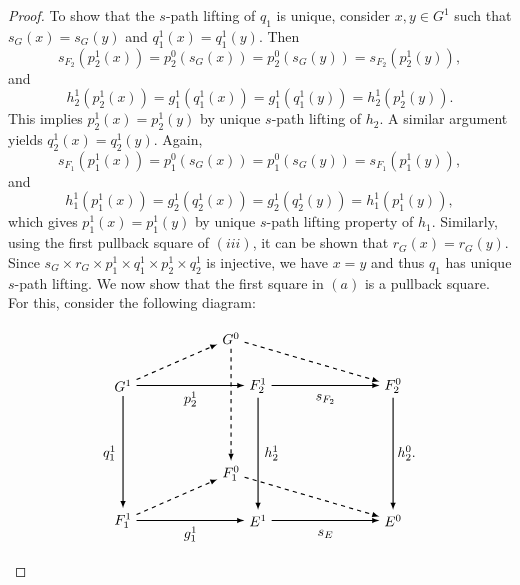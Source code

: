 \documentclass[a4paper,reqno,12pt]{amsart}
\theoremstyle{definition}
\theoremstyle{remark}
\begin{document}
\begin{proof}
To show that the $s$-path lifting of $q_1$ is unique, consider $x,y\in G^1$ such that $s_G(x)=s_G(y)$ and $q_1^1(x)=q_1^1(y)$. Then \[s_{F_2}(p_2^1(x))=p_2^0(s_G(x))=p_2^0(s_G(y))=s_{F_2}(p_2^1(y)),\] and \[h_2^1(p_2^1(x))=g_1^1(q_1^1(x))=g_1^1(q_1^1(y))=h_2^1(p_2^1(y)).\] This implies $p_2^1(x)=p_2^1(y)$ by unique $s$-path lifting of $h_2$. A similar argument yields $q_2^1(x)=q_2^1(y)$. Again, \[s_{F_1}(p_1^1(x))=p_1^0(s_G(x))=p_1^0(s_G(y))=s_{F_1}(p_1^1(y)),\] and \[h_1^1(p_1^1(x))=g_2^1(q_2^1(x))=g_2^1(q_2^1(y))=h_1^1(p_1^1(y)),\] which gives $p_1^1(x)=p_1^1(y)$ by unique $s$-path lifting property of $h_1$. Similarly, using the first pullback square of $(iii)$, it can be shown that $r_G(x)=r_G(y)$. Since $s_G\times r_G\times p_1^1\times q_1^1\times p_2^1\times q_2^1$ is injective, we have $x=y$ and thus $q_1$ has unique $s$-path lifting. We now show that the first square in $(a)$ is a pullback square. For this, consider the following diagram:

\[
\begin{tikzpicture}[scale=1.7]
\node[] (A1) at (0,0) {$G^1$};
\node[] (A2) at (2,0) {$F_2^1$};
\node[] (A3) at (0,-2) {$F_1^1$};
\node[] (A4) at (2,-2) {$E^1$};

\node[] (B1) at (1.6,0.7) {$G^0$};
\node[] (B2) at (4,0) {$F_2^0$};
\node[] (B3) at (1.6,-1.3) {$F_1^0$};
\node[] (B4) at (4,-2) {$E^0$};

\path[->, black, >=latex,thick] (A1) edge [] node[]{} (A2);
\path[->, black, >=latex,thick] (A3) edge [] node[]{} (A4);
\path[->, black, >=latex,thick] (A1) edge [] node[]{} (A3);
\path[->, black, >=latex,thick] (A2) edge [] node[]{} (A4);

\path[->,black, dashed, >=latex,thick] (B1) edge [] node[]{} (B3);
\path[->,black, >=latex,thick] (A4) edge [] node[]{} (B4);
\path[->,black, >=latex,thick] (A2) edge [] node[]{} (B2);
\path[->,black, >=latex,thick] (B2) edge [] node[]{} (B4);

\path[->,black, dashed, >=latex,thick] (A1) edge [] node {} (B1);
\path[->,black, dashed, >=latex,thick] (A3) edge [] node {} (B3);
\path[->,black, dashed, >=latex,thick] (B1) edge [] node {} (B2);
\path[->,black, dashed, >=latex,thick] (B3) edge [] node {} (B4);

\node at (1,-0.2) {$p_2^1$};
\node at (1,-2.2) {$g_1^1$};
\node at (-0.2,-1) {$q_1^1$};
\node at (2.2,-1) {$h_2^1$};

\node at (3,-0.2) {$s_{F_2}$};
\node at (3,-2.2) {$s_E$};
\node at (4.2,-1) {$h_2^0$.};


\end{tikzpicture}\]
\end{proof}
\end{document}

